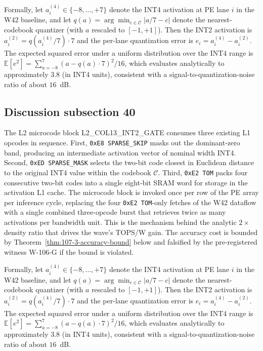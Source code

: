 Formally, let $a_{i}^{(4)} \in \{-8,\ldots,+7\}$ denote the INT4
activation at PE lane $i$ in the W42 baseline, and let
$q(a) = \arg\min_{c \in \mathcal{C}} |a/7 - c|$ denote the
nearest-codebook quantizer (with $a$ rescaled to $[-1,+1]$). Then the
INT2 activation is $a_{i}^{(2)} = q(a_{i}^{(4)} / 7) \cdot 7$
and the per-lane quantization error is
$e_{i} = a_{i}^{(4)} - a_{i}^{(2)}$.
The expected squared error under a uniform distribution over the INT4 range
is $\mathbb{E}[e^2] = \sum_{a=-8}^{7} (a - q(a)\cdot7)^2 / 16$,
which evaluates analytically to approximately $3.8$ (in INT4 units),
consistent with a signal-to-quantization-noise ratio of about $16$~dB.


\subsection{Discussion subsection 40}

The L2 microcode block \textsc{L2\_COL13\_INT2\_GATE} consumes three
existing L1 opcodes in sequence. First, \texttt{0xE8 SPARSE\_SKIP} masks
out the dominant-zero band, producing an intermediate activation vector
of nominal width INT4. Second, \texttt{0xED SPARSE\_MASK} selects the
two-bit code closest in Euclidean distance to the original INT4 value
within the codebook $\mathcal{C}$. Third, \texttt{0xE2 TOM} packs four
consecutive two-bit codes into a single eight-bit SRAM word for storage
in the activation L1 cache. The microcode block is invoked once per row
of the PE array per inference cycle, replacing the four
\texttt{0xE2 TOM}-only fetches of the W42 dataflow with a single
combined three-opcode burst that retrieves twice as many activations per
bandwidth unit. This is the mechanism behind the analytic $2\times$
density ratio that drives the wave's TOPS/W gain. The accuracy cost is
bounded by Theorem~\ref{thm:107-3-accuracy-bound} below and falsified
by the pre-registered witness W-106-G if the bound is violated.

Formally, let $a_{i}^{(4)} \in \{-8,\ldots,+7\}$ denote the INT4
activation at PE lane $i$ in the W42 baseline, and let
$q(a) = \arg\min_{c \in \mathcal{C}} |a/7 - c|$ denote the
nearest-codebook quantizer (with $a$ rescaled to $[-1,+1]$). Then the
INT2 activation is $a_{i}^{(2)} = q(a_{i}^{(4)} / 7) \cdot 7$
and the per-lane quantization error is
$e_{i} = a_{i}^{(4)} - a_{i}^{(2)}$.
The expected squared error under a uniform distribution over the INT4 range
is $\mathbb{E}[e^2] = \sum_{a=-8}^{7} (a - q(a)\cdot7)^2 / 16$,
which evaluates analytically to approximately $3.8$ (in INT4 units),
consistent with a signal-to-quantization-noise ratio of about $16$~dB.


